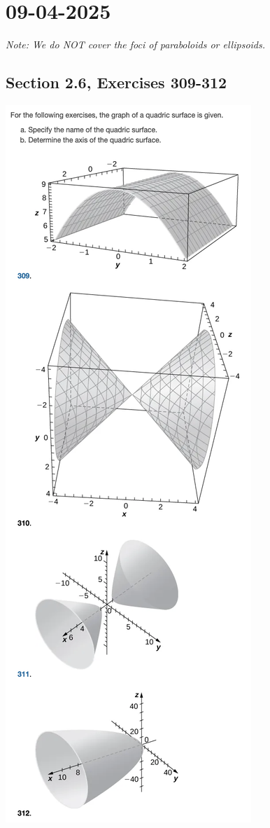 \documentclass[]{mangos-musings}
\begin{document}
\newpage
\section{09-04-2025}
\textit{Note: We do NOT cover the foci of paraboloids or ellipsoids.}
\subsection{Section 2.6, Exercises 309-312}
\includegraphics[scale=0.7]{assets/rec04-ex309-312.png}
\end{document}
